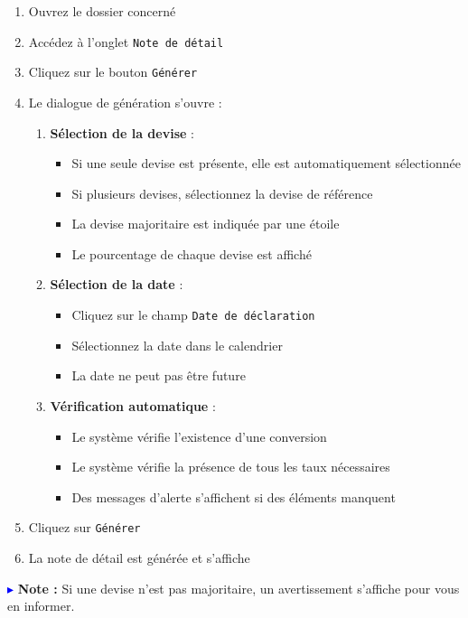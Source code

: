 \documentclass[12pt,a4paper]{report}
\begin{document}
\begin{enumerate}[leftmargin=*]
    \item Ouvrez le dossier concerné
    \item Accédez à l'onglet \texttt{Note de détail}
    \item Cliquez sur le bouton \texttt{Générer}
    \item Le dialogue de génération s'ouvre :
    \begin{enumerate}
        \item \textbf{Sélection de la devise} :
        \begin{itemize}
            \item Si une seule devise est présente, elle est automatiquement sélectionnée
            \item Si plusieurs devises, sélectionnez la devise de référence
            \item La devise majoritaire est indiquée par une étoile
            \item Le pourcentage de chaque devise est affiché
        \end{itemize}
        \item \textbf{Sélection de la date} :
        \begin{itemize}
            \item Cliquez sur le champ \texttt{Date de déclaration}
            \item Sélectionnez la date dans le calendrier
            \item La date ne peut pas être future
        \end{itemize}
        \item \textbf{Vérification automatique} :
        \begin{itemize}
            \item Le système vérifie l'existence d'une conversion
            \item Le système vérifie la présence de tous les taux nécessaires
            \item Des messages d'alerte s'affichent si des éléments manquent
        \end{itemize}
    \end{enumerate}
    \item Cliquez sur \texttt{Générer}
    \item La note de détail est générée et s'affiche
\end{enumerate}

\textcolor{blue}{$\blacktriangleright$} \textbf{Note :} Si une devise n'est pas majoritaire, un avertissement s'affiche pour vous en informer.
\end{document}
